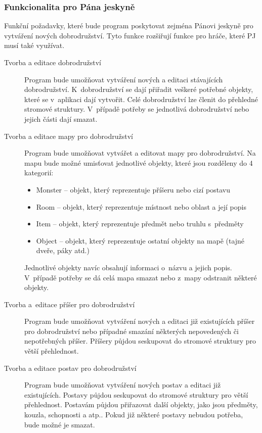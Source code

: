 \documentclass[thesis=B,czech]{resources/FITthesis}[2012/06/26]
\begin{document}
\subsubsection{Funkcionalita pro Pána jeskyně}
Funkční požadavky, které bude program poskytovat zejména Pánovi jeskyně pro vytváření nových dobrodružství. Tyto funkce rozšiřují funkce pro hráče, které PJ musí také využívat.
\begin{description}


\item[Tvorba a editace dobrodružství] Program bude umožňovat vytváření nových a editaci stávajících dobrodružství. K~dobrodružství se dají přiřadit veškeré potřebné objekty, které se v~aplikaci dají vytvořit. Celé dobrodružství lze členit do přehledné stromové struktury. V~případě potřeby se jednotlivá dobrodružství nebo jejich části dají smazat.

\item[Tvorba a editace mapy pro dobrodružství] Program bude umožňovat vytvářet a editovat mapy pro dobrodružství. Na mapu bude možné umisťovat jednotlivé objekty, které jsou rozděleny do 4 kategorií:
\begin{itemize}
\item Monster -- objekt, který reprezentuje příšeru nebo cizí postavu
\item Room -- objekt, který reprezentuje místnost nebo oblast a její popis
\item Item -- objekt, který reprezentuje předmět nebo truhlu s~předměty
\item Object -- objekt, který reprezentuje ostatní  objekty na mapě (tajné dveře, páky atd.)
\end{itemize}
Jednotlivé objekty navíc obsahují informaci o~názvu a jejich popis. V~případě potřeby se dá celá mapa smazat nebo z~mapy odstranit některé objekty. 

\item[Tvorba a~editace příšer pro dobrodružství] Program bude umožňovat vytváření nových a editaci již existujících příšer pro dobrodružství nebo případné smazání některých nepovedených či nepotřebných příšer. Příšery půjdou seskupovat do stromové struktury pro větší přehlednost.

\item[Tvorba a editace postav pro dobrodružství] Program bude umožňovat vytváření nových postav a editaci již existujících. Postavy půjdou seskupovat do stromové struktury pro větší přehlednost. Postavám půjdou přiřazovat další objekty, jako jsou předměty, kouzla, schopnosti a atp.. Pokud již některé postavy nebudou potřeba, bude možné je smazat.


\end{description}
\end{document}
